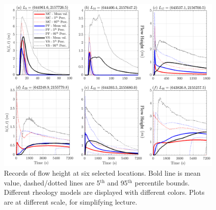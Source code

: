 \documentclass{article}
\begin{document}
\begin{figure}[H]
         \centering
        \includegraphics[width=1\textwidth]{BAF_VolcanDeColima/LocalMeasurments/Height.png}
        \caption{Records of flow height at six selected locations. Bold line is mean value, dashed/dotted lines are 5$^{\mathrm{th}}$ and 95$^{\mathrm{th}}$ percentile bounds. Different rheology models are displayed with different colors. Plots are at different scale, for simplifying lecture.}
        \label{fig:Colima-H}
\end{figure}
\newpage
\end{document}
